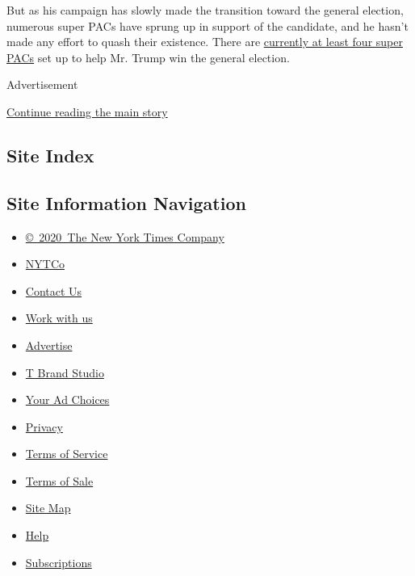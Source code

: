 But as his campaign has slowly made the transition toward the general
election, numerous super PACs have sprung up in support of the
candidate, and he hasn't made any effort to quash their existence. There
are
\href{http://blogs.wsj.com/washwire/2016/06/07/whos-who-meet-the-super-pacs-backing-donald-trump/}{currently
at least four super PACs} set up to help Mr. Trump win the general
election.

Advertisement

\protect\hyperlink{after-bottom}{Continue reading the main story}

\hypertarget{site-index}{%
\subsection{Site Index}\label{site-index}}

\hypertarget{site-information-navigation}{%
\subsection{Site Information
Navigation}\label{site-information-navigation}}

\begin{itemize}
\tightlist
\item
  \href{https://help.nytimes.com/hc/en-us/articles/115014792127-Copyright-notice}{©~2020~The
  New York Times Company}
\end{itemize}

\begin{itemize}
\tightlist
\item
  \href{https://www.nytco.com/}{NYTCo}
\item
  \href{https://help.nytimes.com/hc/en-us/articles/115015385887-Contact-Us}{Contact
  Us}
\item
  \href{https://www.nytco.com/careers/}{Work with us}
\item
  \href{https://nytmediakit.com/}{Advertise}
\item
  \href{http://www.tbrandstudio.com/}{T Brand Studio}
\item
  \href{https://www.nytimes.com/privacy/cookie-policy\#how-do-i-manage-trackers}{Your
  Ad Choices}
\item
  \href{https://www.nytimes.com/privacy}{Privacy}
\item
  \href{https://help.nytimes.com/hc/en-us/articles/115014893428-Terms-of-service}{Terms
  of Service}
\item
  \href{https://help.nytimes.com/hc/en-us/articles/115014893968-Terms-of-sale}{Terms
  of Sale}
\item
  \href{https://spiderbites.nytimes.com}{Site Map}
\item
  \href{https://help.nytimes.com/hc/en-us}{Help}
\item
  \href{https://www.nytimes.com/subscription?campaignId=37WXW}{Subscriptions}
\end{itemize}
